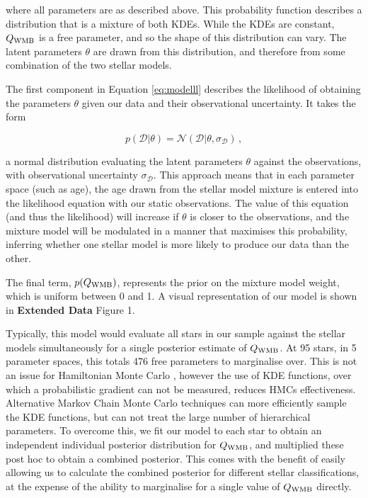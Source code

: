 \documentclass[12pt]{article}
\begin{document}
\noindent where all parameters are as described above. This probability function describes a distribution that is a mixture of both KDEs. While the KDEs are constant, $Q_{\rm WMB}$ is a free parameter, and so the shape of this distribution can vary. The latent parameters $\theta$ are drawn from this distribution, and therefore from some combination of the two stellar models.

The first component in Equation \ref{eq:modelll} describes the likelihood of obtaining the parameters $\theta$ given our data and their observational uncertainty. It takes the form

\begin{equation}
	p(\mathcal{D} | \theta) = \mathcal{N}(\mathcal{D} | \theta, \sigma_{\mathcal{D}})\, ,
\end{equation}

\noindent a normal distribution evaluating the latent parameters $\theta$ against the observations, with observational uncertainty $\sigma_{\mathcal{D}}$. This approach means that in each parameter space (such as age), the age drawn from the stellar model mixture is entered into the likelihood equation with our static observations. The value of this equation (and thus the likelihood) will increase if $\theta$ is closer to the observations, and the mixture model will be modulated in a manner that maximises this probability, inferring whether one stellar model is more likely to produce our data than the other.

The final term, $p(Q_{\rm WMB})$, represents the prior on the mixture model weight, which is uniform between 0 and 1. A visual representation of our model is shown in \textbf{Extended Data} Figure 1.

Typically, this model would evaluate all stars in our sample against the stellar models simultaneously for a single posterior estimate of $Q_{\rm WMB}$. At 95 stars, in 5 parameter spaces, this totals 476 free parameters to marginalise over. This is not an issue for Hamiltonian Monte Carlo \cite[HMC]{betancourt+girolami2013}, however the use of KDE functions, over which a probabilistic gradient can not be measured, reduces HMCs effectiveness. Alternative Markov Chain Monte Carlo techniques \cite[MCMC]{foreman-mackey+2013} can more efficiently sample the KDE functions, but can not treat the large number of hierarchical parameters. To overcome this, we fit our model to each star to obtain an independent individual posterior distribution for $Q_{\rm WMB}$, and multiplied these post hoc to obtain a combined posterior. This comes with the benefit of easily allowing us to calculate the combined posterior for different stellar classifications, at the expense of the ability to marginalise for a single value of $Q_{\rm WMB}$ directly.\\
\end{document}
